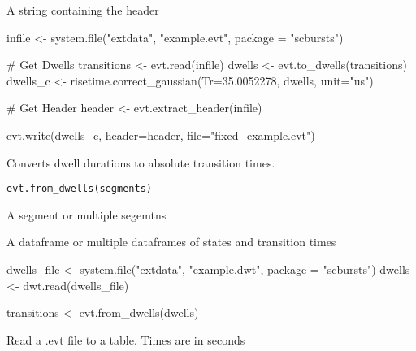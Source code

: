 \documentclass[letterpaper]{book}
\begin{document}
%
\begin{Value}
A string containing the header
\end{Value}
%
\begin{Examples}
\begin{ExampleCode}

infile <- system.file("extdata", "example.evt", package = "scbursts")

# Get Dwells
transitions <- evt.read(infile)
dwells <- evt.to_dwells(transitions)
dwells_c <- risetime.correct_gaussian(Tr=35.0052278, dwells, unit="us")

# Get Header
header <- evt.extract_header(infile)

evt.write(dwells_c, header=header, file="fixed_example.evt")

\end{ExampleCode}
\end{Examples}
%
\begin{Description}\relax
Converts dwell durations to absolute transition times.
\end{Description}
%
\begin{Usage}
\begin{verbatim}
evt.from_dwells(segments)
\end{verbatim}
\end{Usage}
%
\begin{Arguments}
\begin{ldescription}
\item[\code{segments}] A segment or multiple segemtns
\end{ldescription}
\end{Arguments}
%
\begin{Value}
A dataframe or multiple dataframes of states and transition times
\end{Value}
%
\begin{Examples}
\begin{ExampleCode}

dwells_file <- system.file("extdata", "example.dwt", package = "scbursts")
dwells <- dwt.read(dwells_file)

transitions <- evt.from_dwells(dwells)

\end{ExampleCode}
\end{Examples}
%
\begin{Description}\relax
Read a .evt file to a table. Times are in seconds
\end{Description}
\end{document}
